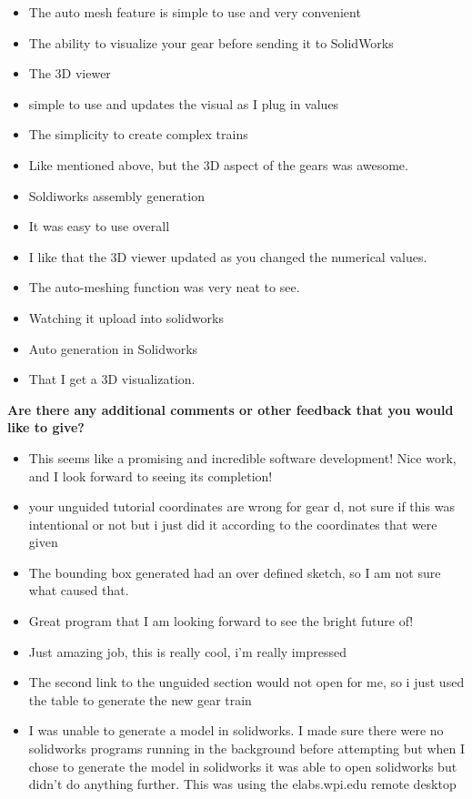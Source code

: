 \begin{itemize}
    \item The auto mesh feature is simple to use and very convenient
    \item The ability to visualize your gear before sending it to SolidWorks
    \item The 3D viewer
    \item simple to use and updates the visual as I plug in values
    \item The simplicity to create complex trains
    \item Like mentioned above, but the 3D aspect of the gears was awesome.
    \item Soldiworks assembly generation
    \item It was easy to use overall
    \item I like that the 3D viewer updated as you changed the numerical values.
    \item The auto-meshing function was very neat to see.
    \item Watching it upload into solidworks 
    \item Auto generation in Solidworks
    \item That I get a 3D visualization. 
\end{itemize}

\noindent\textbf{Are there any additional comments or other feedback that you would like to give?}
\begin{itemize}
    \item This seems like a promising and incredible software development! Nice work, and I look forward to seeing its completion!
    \item your unguided tutorial coordinates are wrong for gear d, not sure if this was intentional or not but i just did it according to the coordinates that were given
    \item The bounding box generated had an over defined sketch, so I am not sure what caused that.
    \item Great program that I am looking forward to see the bright future of!
    \item Just amazing job, this is really cool, i'm really impressed 
    \item The second link to the unguided section would not open for me, so i just used the table to generate the new gear train
    \item I was unable to generate a model in solidworks. I made sure there were no solidworks programs running in the background before attempting but when I chose to generate the model in solidworks it was able to open solidworks but didn't do anything further. This was using the elabs.wpi.edu remote desktop
\end{itemize}

